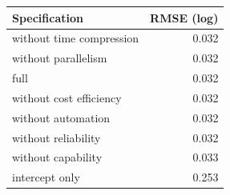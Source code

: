 \begin{tabular}{lr}
\toprule
Specification & RMSE (log) \\
\midrule
without time compression & 0.032 \\
without parallelism & 0.032 \\
full & 0.032 \\
without cost efficiency & 0.032 \\
without automation & 0.032 \\
without reliability & 0.032 \\
without capability & 0.033 \\
intercept only & 0.253 \\
\bottomrule
\end{tabular}
